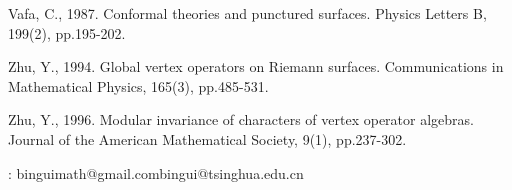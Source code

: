 \documentclass[12pt,a4paper,notitlepage]{article}
\theoremstyle{definition}
\theoremstyle{plain}
\numberwithin{equation}{section}
\begin{document}
\begin{thebibliography}{999999}
Vafa, C., 1987. Conformal theories and punctured surfaces. Physics Letters B, 199(2), pp.195-202.	
		
Zhu, Y., 1994. Global vertex operators on Riemann surfaces. Communications in Mathematical Physics, 165(3), pp.485-531.
		
Zhu, Y., 1996. Modular invariance of characters of vertex operator algebras. Journal of the American Mathematical Society, 9(1), pp.237-302.
		
		
		
		
		
	\end{thebibliography}


: binguimath@gmail.com\qquad bingui@tsinghua.edu.cn
\end{document}
